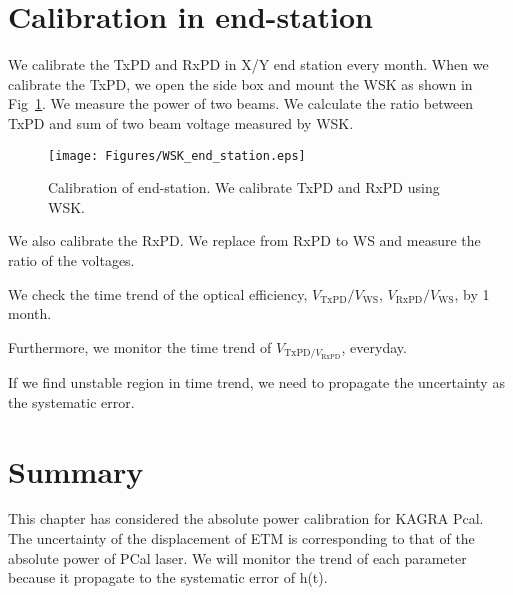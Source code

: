 \section{Calibration in end-station}
We calibrate the TxPD and RxPD in X/Y end station every month. When we calibrate the TxPD, we open the side box and mount the WSK as shown in Fig~\ref{fig:WSK_end_station}. We measure the power of two beams. We calculate the ratio between TxPD and sum of two beam voltage measured by WSK. 


\begin{figure}
\begin{center}
\texttt{[image: Figures/WSK\_end\_station.eps]}
\caption{Calibration of end-station. We calibrate TxPD and RxPD using WSK.} 
\label{fig:WSK_end_station} 
\end{center}
\end{figure}

We also calibrate the RxPD. We replace from RxPD to WS and measure the ratio of the voltages. 

We check the time trend of the optical efficiency, $V_{\mathrm{TxPD}}/V_{\mathrm{WS}}$, $V_{\mathrm{RxPD}}/V_{\mathrm{WS}}$, by 1 month.

Furthermore, we monitor the time trend of $V_{\mathrm{TxPD}/V_{\mathrm{RxPD}}}$, everyday.

If we find unstable region in time trend, we need to propagate the uncertainty as the systematic error.
\section{Summary}
This chapter has considered the absolute power calibration for KAGRA Pcal. The uncertainty of the displacement of ETM is corresponding to that of the absolute power of PCal laser. We will monitor the trend of each parameter because it propagate to the systematic error of h(t). 






